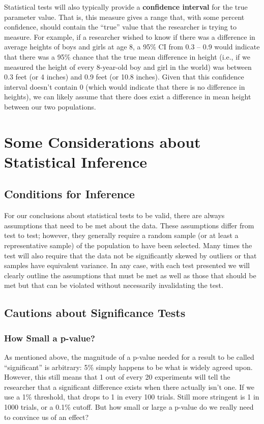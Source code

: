 Statistical tests will also typically provide a \textbf{confidence interval} for the true parameter value. That is, this measure gives a range that, with some percent confidence, should contain the ``true'' value that the researcher is trying to measure. For example, if a researcher wished to know if there was a difference in average heights of boys and girls at age 8, a 95\% CI from 0.3 -- 0.9 would indicate that there was a 95\% chance that the true mean difference in height (i.e., if we measured the height of every 8-year-old boy and girl in the world) was between 0.3 feet (or 4 inches) and 0.9 feet (or 10.8 inches). Given that this confidence interval doesn't contain 0 (which would indicate that there is no difference in heights), we can likely assume that there does exist a difference in mean height between our two populations.

\section{Some Considerations about Statistical Inference}

\subsection{Conditions for Inference}
For our conclusions about statistical tests to be valid, there are always assumptions that need to be met about the data. These assumptions differ from test to test; however, they generally require a random sample (or at least a representative sample) of the population to have been selected. Many times the test will also require that the data not be significantly skewed by outliers or that samples have equivalent variance. In any case, with each test presented we will clearly outline the assumptions that must be met as well as those that should be met but that can be violated without necessarily invalidating the test.

\subsection{Cautions about Significance Tests}
\subsubsection{How Small a p-value?}
As mentioned above, the magnitude of a p-value needed for a result to be called ``significant'' is arbitrary: 5\% simply happens to be what is widely agreed upon. However, this still means that 1 out of every 20 experiments will tell the researcher that a significant difference exists when there actually isn't one. If we use a 1\% threshold, that drops to 1 in every 100 trials. Still more stringent is 1 in 1000 trials, or a 0.1\% cutoff. But how small or large a p-value do we really need to convince us of an effect?

